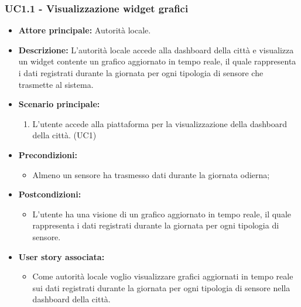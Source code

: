 \subsubsection{UC1.1 - Visualizzazione widget grafici}
\begin{itemize}
    \item \textbf{Attore principale:} Autorità locale.
    \item \textbf{Descrizione:} L'autorità locale accede alla dashboard della città e visualizza un widget contente un grafico aggiornato in tempo reale, il quale rappresenta i dati registrati durante la giornata per ogni tipologia di sensore che trasmette al sistema.
    \item \textbf{Scenario principale:}
        \begin{enumerate}
            \item L'utente accede alla piattaforma per la visualizzazione della dashboard della città. (UC1)
        \end{enumerate}
    \item \textbf{Precondizioni:}
        \begin{itemize}
            \item Almeno un sensore ha trasmesso dati durante la giornata odierna;
        \end{itemize}
    \item \textbf{Postcondizioni:}
        \begin{itemize}
            \item L'utente ha una visione di un grafico aggiornato in tempo reale, il quale rappresenta i dati registrati durante la giornata per ogni tipologia di sensore.
        \end{itemize}
    \item \textbf{User story associata:}
        \begin{itemize}
            \item Come autorità locale voglio visualizzare grafici aggiornati in tempo reale sui dati registrati durante la giornata per ogni tipologia di sensore nella dashboard della città.
        \end{itemize}
\end{itemize}
